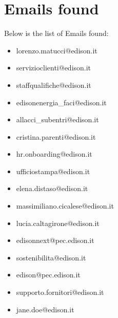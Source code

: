 \documentclass{article}
\begin{document}
\clearpage

\section{Emails found}

Below is the list of Emails found:

\begin{itemize}
    
        
            \item lorenzo.matucci@edison.it
        
            \item servizioclienti@edison.it
        
            \item staffqualifiche@edison.it
        
            \item edisonenergia\_faci@edison.it
        
            \item allacci\_subentri@edison.it
        
            \item cristina.parenti@edison.it
        
            \item hr.onboarding@edison.it
        
            \item ufficiostampa@edison.it
        
            \item elena.distaso@edison.it
        
            \item massimiliano.cicalese@edison.it
        
            \item lucia.caltagirone@edison.it
        
            \item edisonnext@pec.edison.it
        
            \item sostenibilita@edison.it
        
            \item edison@pec.edison.it
        
            \item supporto.fornitori@edison.it
        
            \item jane.doe@edison.it
        
    
\end{itemize}
\end{document}
